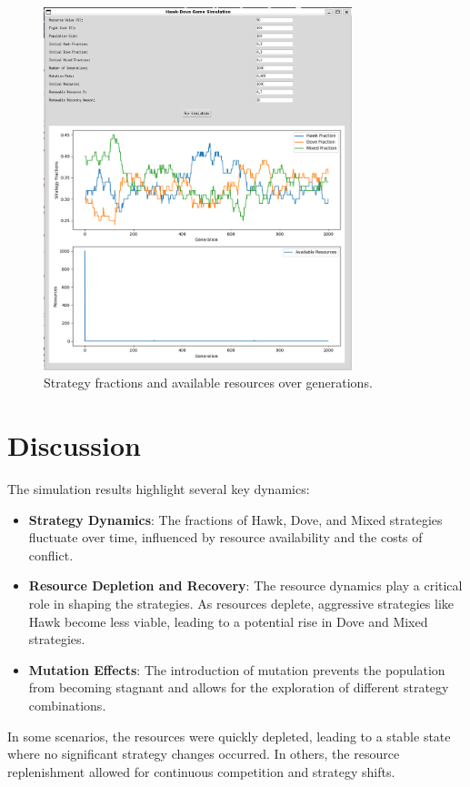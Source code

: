 \documentclass{article}
\begin{document}
\begin{figure}[h]
    \centering
    \includegraphics[width=0.8\textwidth]{HawkDoveGame.png}
    \caption{Strategy fractions and available resources over generations.}
    \label{fig:results}
\end{figure}

\section{Discussion}
The simulation results highlight several key dynamics:
\begin{itemize}
    \item \textbf{Strategy Dynamics}: The fractions of Hawk, Dove, and Mixed strategies fluctuate over time, influenced by resource availability and the costs of conflict.
    \item \textbf{Resource Depletion and Recovery}: The resource dynamics play a critical role in shaping the strategies. As resources deplete, aggressive strategies like Hawk become less viable, leading to a potential rise in Dove and Mixed strategies.
    \item \textbf{Mutation Effects}: The introduction of mutation prevents the population from becoming stagnant and allows for the exploration of different strategy combinations.
\end{itemize}

In some scenarios, the resources were quickly depleted, leading to a stable state where no significant strategy changes occurred. In others, the resource replenishment allowed for continuous competition and strategy shifts.
\end{document}
